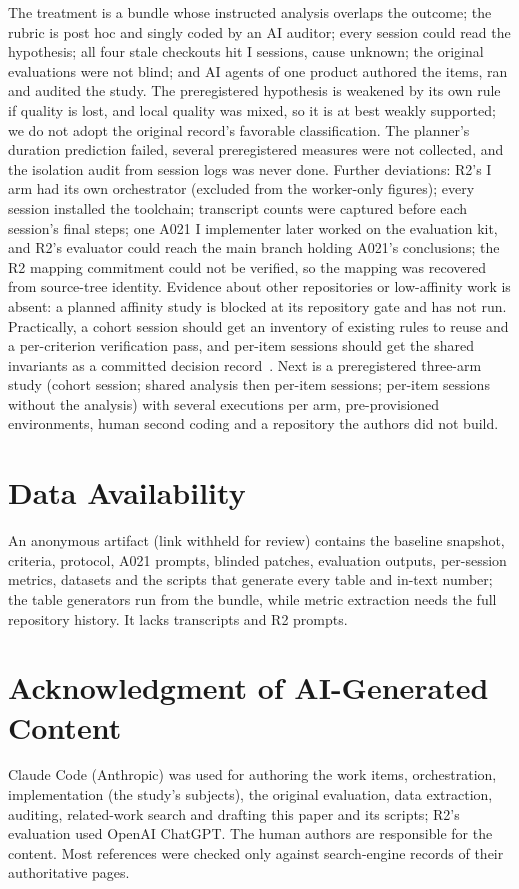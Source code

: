 \documentclass[10pt,conference]{IEEEtran}
\newcommand{\I}{I}
\begin{document}
The treatment is a bundle whose instructed analysis overlaps the outcome; the rubric is post hoc and singly coded by an AI auditor; every session could read the hypothesis; all four stale checkouts hit \I{} sessions, cause unknown; the original evaluations were not blind; and AI agents of one product authored the items, ran and audited the study. %
The preregistered hypothesis is weakened by its own rule if quality is lost, and local quality was mixed, so it is at best weakly supported; we do not adopt the original record's favorable classification. %
The planner's duration prediction failed, several preregistered measures were not collected, and the isolation audit from session logs was never done. %
Further deviations: R2's \I{} arm had its own orchestrator (excluded from the worker-only figures); every session installed the toolchain; transcript counts were captured before each session's final steps; one A021 \I{} implementer later worked on the evaluation kit, and R2's evaluator could reach the main branch holding A021's conclusions; the R2 mapping commitment could not be verified, so the mapping was recovered from source-tree identity. %
Evidence about other repositories or low-affinity work is absent: a planned affinity study is blocked at its repository gate and has not run. %
Practically, a cohort session should get an inventory of existing rules to reuse and a per-criterion verification pass, and per-item sessions should get the shared invariants as a committed decision record~\cite{song2026crosscontext}. %
Next is a preregistered three-arm study (cohort session; shared analysis then per-item sessions; per-item sessions without the analysis) with several executions per arm, pre-provisioned environments, human second coding and a repository the authors did not build.

\section*{Data Availability}
An anonymous artifact (link withheld for review) contains the baseline snapshot, criteria, protocol, A021 prompts, blinded patches, evaluation outputs, per-session metrics, datasets and the scripts that generate every table and in-text number; the table generators run from the bundle, while metric extraction needs the full repository history. It lacks transcripts and R2 prompts. %

\section*{Acknowledgment of AI-Generated Content}
Claude Code (Anthropic) was used for authoring the work items, orchestration, implementation (the study's subjects), the original evaluation, data extraction, auditing, related-work search and drafting this paper and its scripts; R2's evaluation used OpenAI ChatGPT. The human authors are responsible for the content. Most references were checked only against search-engine records of their authoritative pages.



\end{document}
